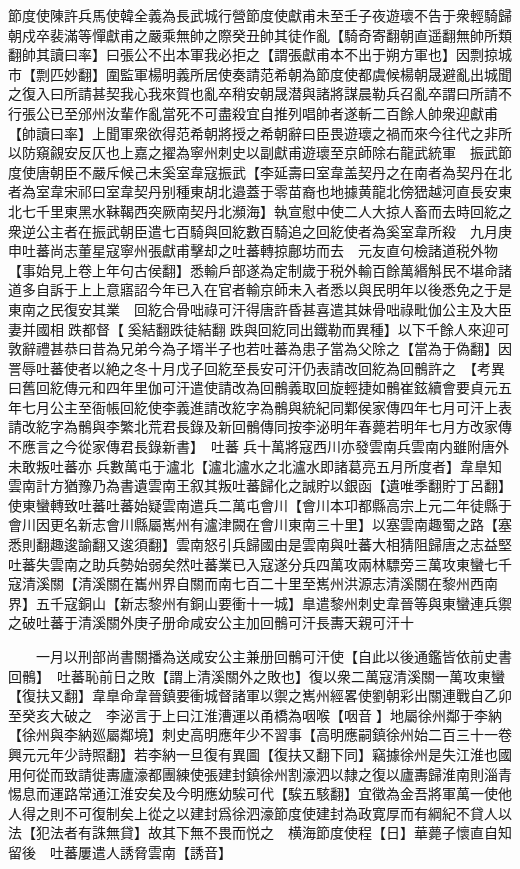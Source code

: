 節度使陳許兵馬使韓全義為長武城行營節度使獻甫未至壬子夜遊瓌不告于衆輕騎歸朝戍卒裴滿等憚獻甫之嚴乘無帥之際癸丑帥其徒作亂【騎奇寄翻朝直遥翻無帥所類翻帥其讀曰率】曰張公不出本軍我必拒之【謂張獻甫本不出于朔方軍也】因剽掠城市【剽匹妙翻】圍監軍楊明義所居使奏請范希朝為節度使都虞候楊朝晟避亂出城聞之復入曰所請甚契我心我來賀也亂卒稍安朝晟潜與諸將謀晨勒兵召亂卒謂曰所請不行張公已至邠州汝輩作亂當死不可盡殺宜自推列唱帥者遂斬二百餘人帥衆迎獻甫【帥讀曰率】上聞軍衆欲得范希朝將授之希朝辭曰臣畏遊瓌之禍而來今往代之非所以防窺覦安反仄也上嘉之擢為寧州刺史以副獻甫遊瓌至京師除右龍武統軍　振武節度使唐朝臣不嚴斥候己未奚室韋寇振武【李延壽曰室韋盖契丹之在南者為契丹在北者為室韋宋祁曰室韋契丹别種東胡北邉蓋于零苗裔也地據黄龍北傍峱越河直長安東北七千里東黑水靺鞨西突厥南契丹北瀕海】執宣慰中使二人大掠人畜而去時回紇之衆逆公主者在振武朝臣遣七百騎與回紇數百騎追之回紇使者為奚室韋所殺　九月庚申吐蕃尚志董星寇寧州張獻甫擊却之吐蕃轉掠鄜坊而去　元友直句檢諸道税外物【事始見上卷上年句古侯翻】悉輸戶部遂為定制歲于税外輸百餘萬緡斛民不堪命諸道多自訴于上上意寤詔今年已入在官者輸京師未入者悉以與民明年以後悉免之于是東南之民復安其業　回紇合骨咄祿可汗得唐許昏甚喜遣其妹骨咄祿毗伽公主及大臣妻并國相跌都督【奚結翻跌徒結翻跌與回紇同出鐵勒而異種】以下千餘人來迎可敦辭禮甚恭曰昔為兄弟今為子壻半子也若吐蕃為患子當為父除之【當為于偽翻】因詈辱吐蕃使者以絶之冬十月戊子回紇至長安可汗仍表請改回紇為回鶻許之　【考異曰舊回紇傳元和四年里伽可汗遣使請改為回鶻義取回旋輕捷如鶻崔鉉續會要貞元五年七月公主至衙帳回紇使李義進請改紇字為鶻與統紀同鄴侯家傳四年七月可汗上表請改紇字為鶻與李繁北荒君長錄及新回鶻傳同按李泌明年春薨若明年七月方改家傳不應言之今從家傳君長錄新書】　吐蕃兵十萬將寇西川亦發雲南兵雲南内雖附唐外未敢叛吐蕃亦兵數萬屯于瀘北【瀘北瀘水之北瀘水即諸葛亮五月所度者】韋臯知雲南計方猶豫乃為書遺雲南王叙其叛吐蕃歸化之誠貯以銀函【遺唯季翻貯丁呂翻】使東蠻轉致吐蕃吐蕃始疑雲南遣兵二萬屯會川【會川本卭都縣高宗上元二年徒縣于會川因更名新志會川縣屬嶲州有瀘津闕在會川東南三十里】以塞雲南趣蜀之路【塞悉則翻趣逡諭翻又逡須翻】雲南怒引兵歸國由是雲南與吐蕃大相猜阻歸唐之志益堅吐蕃失雲南之助兵勢始弱矣然吐蕃業已入寇遂分兵四萬攻兩林驃旁三萬攻東蠻七千寇清溪關【清溪關在巂州界自關而南七百二十里至嶲州洪源志清溪關在黎州西南界】五千寇銅山【新志黎州有銅山要衝十一城】臯遣黎州刺史韋晉等與東蠻連兵禦之破吐蕃于清溪關外庚子册命咸安公主加回鶻可汗長夀天親可汗十

　　一月以刑部尚書關播為送咸安公主兼册回鶻可汗使【自此以後通鑑皆依前史書回鶻】　吐蕃恥前日之敗【謂上清溪關外之敗也】復以衆二萬寇清溪關一萬攻東蠻【復扶又翻】韋臯命韋晉鎮要衝城督諸軍以禦之嶲州經畧使劉朝彩出關連戰自乙卯至癸亥大破之　李泌言于上曰江淮漕運以甬橋為咽喉【咽音】地屬徐州鄰于李納【徐州與李納廵屬鄰境】刺史高明應年少不習事【高明應嗣鎮徐州始二百三十一卷興元元年少詩照翻】若李納一旦復有異圖【復扶又翻下同】竊據徐州是失江淮也國用何從而致請徙夀廬濠都團練使張建封鎮徐州割濠泗以隸之復以廬夀歸淮南則淄青惕息而運路常通江淮安矣及今明應幼騃可代【騃五駭翻】宜徵為金吾將軍萬一使他人得之則不可復制矣上從之以建封爲徐泗濠節度使建封為政寛厚而有綱紀不貸人以法【犯法者有誅無貸】故其下無不畏而悦之　横海節度使程【日】華薨子懷直自知留後　吐蕃屢遣人誘脅雲南【誘音】

